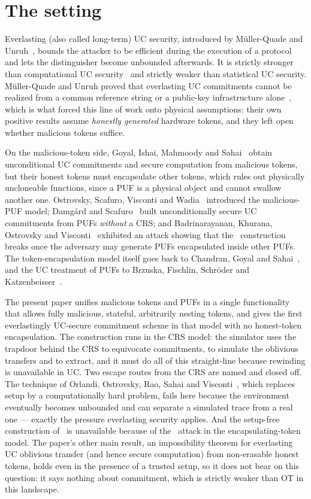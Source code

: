 \documentclass{aicr-conjecture}
\begin{document}
\section{The setting}\label{sec:setting}

Everlasting (also called long-term) UC security, introduced by
M\"uller-Quade and Unruh~\cite{MQU10}, bounds the attacker to be
efficient during the execution of a protocol and lets the distinguisher
become unbounded afterwards. It is strictly stronger than computational
UC security~\cite{Can01} and strictly weaker than statistical UC
security. M\"uller-Quade and Unruh proved that everlasting UC
commitments cannot be realized from a common reference string or a
public-key infrastructure alone~\cite{MQU10}, which is what forced this
line of work onto physical assumptions: their own positive results
assume \emph{honestly generated} hardware tokens, and they left open
whether malicious tokens suffice.

On the malicious-token side, Goyal, Ishai, Mahmoody and
Sahai~\cite{GIMS10} obtain unconditional UC commitments and secure
computation from malicious tokens, but their honest tokens must
encapsulate other tokens, which rules out physically uncloneable
functions, since a PUF is a physical object and cannot swallow another
one. Ostrovsky, Scafuro, Visconti and Wadia~\cite{OSVW13} introduced
the malicious-PUF model; Damg\aa{}rd and Scafuro~\cite{DS13} built
unconditionally secure UC commitments from PUFs \emph{without} a CRS;
and Badrinarayanan, Khurana, Ostrovsky and Visconti~\cite{BKOV17}
exhibited an attack showing that the~\cite{DS13} construction breaks
once the adversary may generate PUFs encapsulated inside other PUFs.
The token-encapsulation model itself goes back to Chandran, Goyal and
Sahai~\cite{CGS08}, and the UC treatment of PUFs to Brzuska, Fischlin,
Schr\"oder and Katzenbeisser~\cite{BFSK11}.

The present paper unifies malicious tokens and PUFs in a single
functionality that allows fully malicious, stateful, arbitrarily
nesting tokens, and gives the first everlastingly UC-secure commitment
scheme in that model with no honest-token encapsulation. The
construction runs in the CRS model: the simulator uses the trapdoor
behind the CRS to equivocate commitments, to simulate the oblivious
transfers and to extract, and it must do all of this straight-line
because rewinding is unavailable in UC. Two escape routes from the CRS
are named and closed off. The technique of Orlandi, Ostrovsky, Rao,
Sahai and Visconti~\cite{OOR+14}, which replaces setup by a
computationally hard problem, fails here because the environment
eventually becomes unbounded and can separate a simulated trace from a
real one --- exactly the pressure everlasting security applies. And the
setup-free construction of~\cite{DS13} is unavailable because of
the~\cite{BKOV17} attack in the encapsulating-token model. The paper's
other main result, an impossibility theorem for everlasting UC
oblivious transfer (and hence secure computation) from non-erasable
honest tokens, holds even in the presence of a trusted setup, so it
does not bear on this question: it says nothing about commitment, which
is strictly weaker than OT in this landscape.
\end{document}

